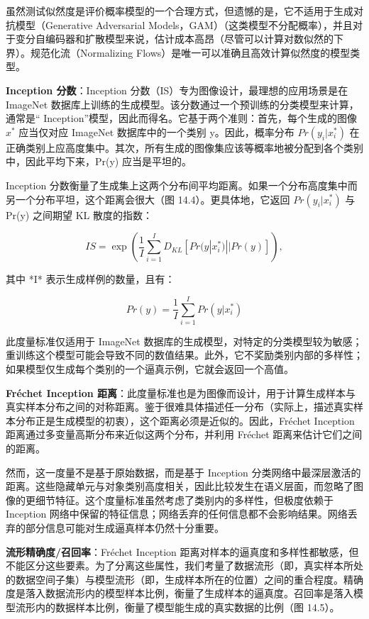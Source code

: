虽然测试似然度是评价概率模型的一个合理方式，但遗憾的是，它不适用于生成对抗模型（Generative Adversarial Models，GAM）（这类模型不分配概率），并且对于变分自编码器和扩散模型来说，估计成本高昂（尽管可以计算对数似然的下界）。规范化流（Normalizing Flows）是唯一可以准确且高效计算似然度的模型类型。

\textbf{Inception 分数}：Inception 分数（IS）专为图像设计，最理想的应用场景是在 ImageNet 数据库上训练的生成模型。该分数通过一个预训练的分类模型来计算，通常是“ Inception”模型，因此而得名。它基于两个准则：首先，每个生成的图像 \(x^*\) 应当仅对应 ImageNet 数据库中的一个类别 y。因此，概率分布 \(Pr(y_i|x^*_i)\) 在正确类别上应高度集中。其次，所有生成的图像集应该等概率地被分配到各个类别中，因此平均下来，Pr(y) 应当是平坦的。

Inception 分数衡量了生成集上这两个分布间平均距离。如果一个分布高度集中而另一个分布平坦，这个距离会很大（图 14.4）。更具体地，它返回 \(Pr(y_i|x^*_i)\) 与 Pr(y) 之间期望 KL 散度的指数：

\begin{equation}
IS = \exp \left( \frac{1}{I} \sum_{i=1}^{I} D_{KL} [ Pr(y|x_i^*) || Pr(y) ] \right),
\end{equation}

其中 *I* 表示生成样例的数量，且有：

\begin{equation}
Pr(y) = \frac{1}{I} \sum_{i=1}^{I} Pr(y|x_i^*)
\end{equation}

此度量标准仅适用于 ImageNet 数据库的生成模型，对特定的分类模型较为敏感；重训练这个模型可能会导致不同的数值结果。此外，它不奖励类别内部的多样性；如果模型仅生成每个类别的一个逼真示例，它就会返回一个高值。

\textbf{Fréchet Inception 距离}：此度量标准也是为图像而设计，用于计算生成样本与真实样本分布之间的对称距离。鉴于很难具体描述任一分布（实际上，描述真实样本分布正是生成模型的初衷），这个距离必须是近似的。因此，Fréchet Inception 距离通过多变量高斯分布来近似这两个分布，并利用 Fréchet 距离来估计它们之间的距离。

然而，这一度量不是基于原始数据，而是基于 Inception 分类网络中最深层激活的距离。这些隐藏单元与对象类别高度相关，因此比较发生在语义层面，而忽略了图像的更细节特征。这个度量标准虽然考虑了类别内的多样性，但极度依赖于 Inception 网络中保留的特征信息；网络丢弃的任何信息都不会影响结果。网络丢弃的部分信息可能对生成逼真样本仍然十分重要。

\textbf{流形精确度/召回率}：Fréchet Inception 距离对样本的逼真度和多样性都敏感，但不能区分这些要素。为了分离这些属性，我们考量了数据流形（即，真实样本所处的数据空间子集）与模型流形（即，生成样本所在的位置）之间的重合程度。精确度是落入数据流形内的模型样本比例，衡量了生成样本的逼真度。召回率是落入模型流形内的数据样本比例，衡量了模型能生成的真实数据的比例（图 14.5）。

